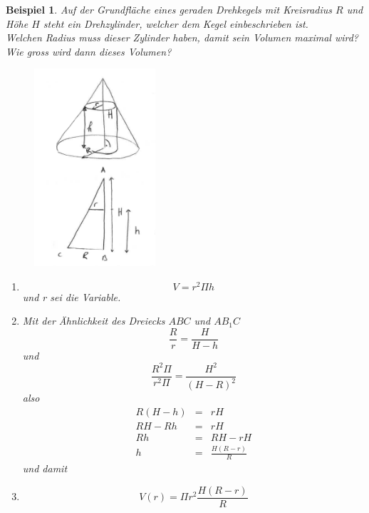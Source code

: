 \documentclass{report}
\newtheorem{myexample}{Beispiel}
\begin{document}
\begin{myexample}
	Auf der Grundfläche eines geraden Drehkegels mit Kreisradius $R$ und Höhe $H$ steht ein Drehzylinder, welcher dem Kegel einbeschrieben ist.\\
	Welchen Radius muss dieser Zylinder haben, damit sein Volumen maximal wird?\\
	Wie gross wird dann dieses Volumen?\\
	\begin{figure}[H]
			\centering
			\includegraphics[width=0.4\textwidth]{images/extremalwertproblem3.png}
	\end{figure}
	\begin{enumerate}
		\item
			\begin{equation*}V = r^2\Pi h\end{equation*}
			und r sei die Variable.
		\item
			Mit der Ähnlichkeit des Dreiecks $ABC$ und $AB_1C$
			\begin{equation*}\frac{R}{r} = \frac{H}{H-h}\end{equation*} 
			und
		\begin{equation*}\frac{R^2\Pi}{r^2\Pi} = \frac{H^2}{(H-R)^2}\end{equation*}
			also
			\begin{eqnarray*}
				R(H-h) &=& rH\\
				RH-Rh &=& rH\\
				Rh &=& RH-rH\\
				h &=& \frac{H(R-r)}{R}
			\end{eqnarray*}
			und damit
		\item
			\begin{equation*}V(r) = \Pi r^2 \frac{H(R-r)}{R}\end{equation*}

\end{enumerate}
\end{myexample}
\end{document}
